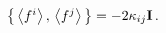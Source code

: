 \begin{equation}\label{ffkf}
 \left\{\,\textstyle{\left<f^i\right>,\,\left<f^j\right>}\,\right\}
=-2\kappa_{ij} {\bf I}\,.
\end{equation} 
